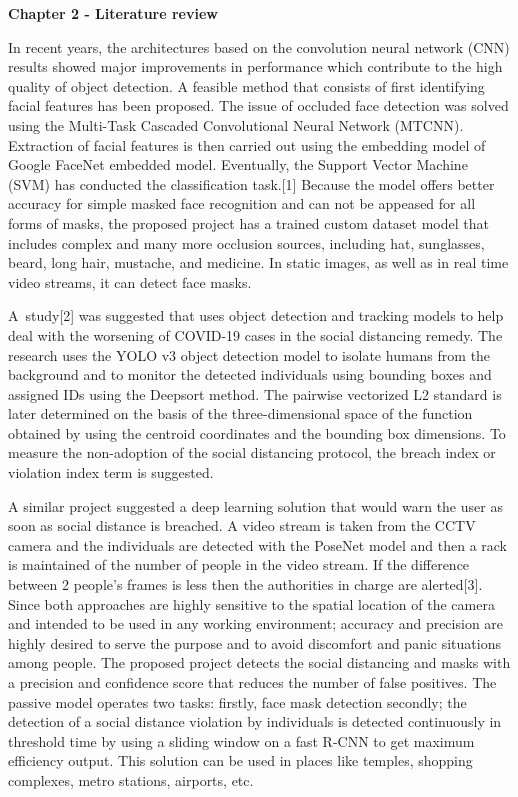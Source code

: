 \documentclass[12pt]{article}
\begin{document}
\begin{Center}
{\fontsize{18pt}{21.6pt}\selectfont \textbf{Chapter 2 - Literature review}}
\end{Center}
\setlength{\parskip}{12.0pt}
\begin{justify}
 \tab In recent years, the architectures based on the convolution neural network (CNN) results showed major improvements in performance which contribute to the high quality of object detection. A feasible method that consists of first identifying facial features has been proposed. The issue of occluded face detection was solved using the Multi-Task Cascaded Convolutional Neural Network (MTCNN). Extraction of facial features is then carried out using the embedding model of Google FaceNet embedded model. Eventually, the Support Vector Machine (SVM) has conducted the classification task.[1] Because the model offers better accuracy for simple masked face recognition and can not be appeased for all forms of masks, the proposed project has a trained custom dataset model that includes complex and many more occlusion sources, including hat, sunglasses, beard, long hair, mustache, and medicine. In static images, as well as in real time video streams, it can detect face masks. 
\end{justify}
\begin{justify}
 \tab A\ study[2] was suggested that uses object detection and tracking models to help deal with the worsening of COVID-19 cases in the social distancing remedy. The research uses the YOLO v3 object detection model to isolate humans from the background and to monitor the detected individuals using bounding boxes and assigned IDs using the Deepsort method. The pairwise vectorized L2 standard is later determined on the basis of the three-dimensional space of the function obtained by using the centroid coordinates and the bounding box dimensions. To measure the non-adoption of the social distancing protocol, the breach index  or violation index term is suggested.
\end{justify}
\begin{justify}
 A similar project suggested a deep learning solution that would warn the user as soon as social distance is breached. A video stream is taken from the CCTV camera and the individuals are detected with the PoseNet model and then a rack is maintained of the number of people in the video stream. If the difference between 2 people's frames is less then the authorities in charge are alerted[3]. Since both approaches are highly sensitive to the spatial location of the camera and intended to be used in any working environment; accuracy and precision are highly desired to serve the purpose and to avoid discomfort and panic situations among people. The proposed project detects the social distancing and masks with a precision and confidence score that reduces the number of false positives. The passive model operates two tasks: firstly, face mask detection secondly; the detection of a social distance violation by individuals is detected continuously in threshold time by using a sliding window on a fast R-CNN to get maximum efficiency output. This solution can be used in places like temples, shopping complexes, metro stations, airports, etc.
\end{justify}
\end{document}
